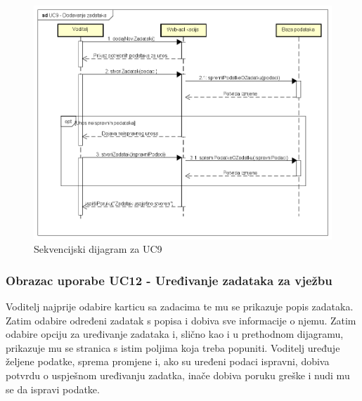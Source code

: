 				\begin{figure}[H]
					\includegraphics[width=\textwidth]{slike/SEQ_UC9.PNG}
					\caption{Sekvencijski dijagram za UC9}
					\label{fig:seq_uc9}
				\end{figure}
			\eject
				
				\subsubsection{Obrazac uporabe UC12 - Uređivanje zadataka za vježbu}
				
				\noindent Voditelj najprije odabire karticu sa zadacima te mu se prikazuje popis zadataka. Zatim odabire određeni zadatak s popisa i dobiva sve informacije o njemu. Zatim odabire opciju za uređivanje zadataka i, slično kao i u prethodnom dijagramu, prikazuje mu se stranica s istim poljima koja treba popuniti. Voditelj uređuje željene podatke, sprema promjene i, ako su uređeni podaci ispravni, dobiva potvrdu o uspješnom uređivanju zadatka, inače dobiva poruku greške i nudi mu se da ispravi podatke.
				
